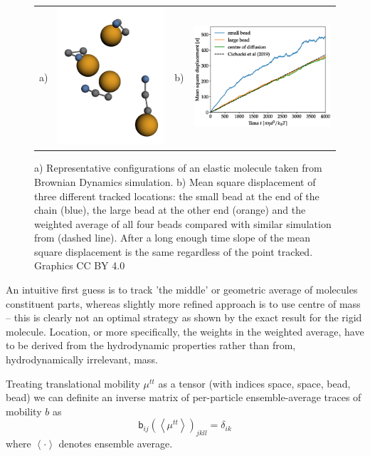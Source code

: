 \documentclass{doctoral}
\newcommand{\mm}[1]{\bm{\mathsf{#1}}} %
\begin{document}
\begin{figure}[h]
    \centering
    \begin{tabular}{llll}
        a)                                                                         &
        \includegraphics[height=0.3\linewidth,valign=t]{figures/sample_shapes.png} &
        b)                                                                         &
        \includegraphics[height=0.3\linewidth,valign=t]{figures/mean_square_displacement.eps}
    \end{tabular}

    \caption{a) Representative configurations of an elastic molecule taken from Brownian Dynamics simulation.
        b) Mean square displacement of three different tracked locations: the small bead at the end of the chain (blue), the large bead at the other end (orange) and the weighted average of all four beads compared with similar simulation from \textcite{Cichocki_2019} (dashed line).
        After a long enough time slope of the mean square displacement is the same regardless of the point tracked.
        Graphics CC BY 4.0\cite{Waszkiewicz_2023_pychastic} } \label{fig:dl_and_ds}
\end{figure}

An intuitive first guess is to track 'the middle' or geometric average of molecules constituent parts, whereas slightly more refined approach is to use centre of mass -- this is clearly not an optimal strategy as shown by the exact result for the rigid molecule.
Location, or more specifically, the weights in the weighted average, have to be derived from the hydrodynamic properties rather than from, hydrodynamically irrelevant, mass.

Treating translational mobility $\mm{\mu}^{tt}$ as a tensor (with indices space, space, bead, bead) we can definite an inverse matrix of per-particle ensemble-average traces of mobility $b$ as
\begin{equation}
    \mm{b}_{ij} \left(\left< \mm{\mu}^{tt} \right> \right)_{jkll} = \mm{\delta}_{ik}
\end{equation}
where $\left< \cdot \right>$ denotes ensemble average.
\end{document}
